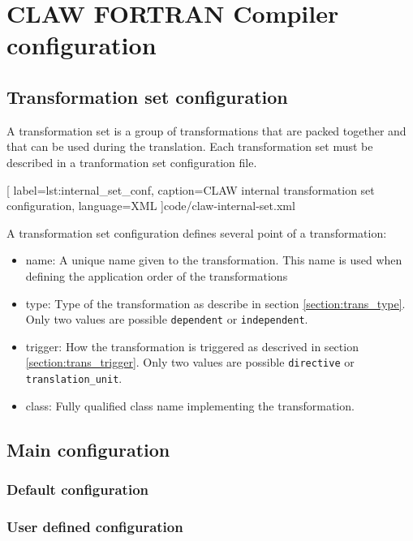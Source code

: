 \chapter{CLAW FORTRAN Compiler configuration}
\section{Transformation set configuration}
A transformation set is a group of transformations that are packed together and
that can be used during the translation. Each transformation set must be
described in a tranformation set configuration file.


  [
    label=lst:internal_set_conf,
    caption=CLAW internal transformation set configuration,
    language=XML
  ]{code/claw-internal-set.xml}

A transformation set configuration defines several point of a transformation:
\begin{itemize}
  \item name: A unique name given to the transformation. This name is used when
        defining the application order of the transformations
  \item type: Type of the transformation as describe in section
        \ref{section:trans_type}. Only two values are possible
        \lstinline|dependent| or \lstinline|independent|.
  \item trigger: How the transformation is triggered as descrived in section
        \ref{section:trans_trigger}. Only two values are possible
        \lstinline|directive| or \lstinline|translation_unit|.
  \item class: Fully qualified class name implementing the transformation.
\end{itemize}

\section{Main configuration}
\subsection{Default configuration}
\subsection{User defined configuration}
